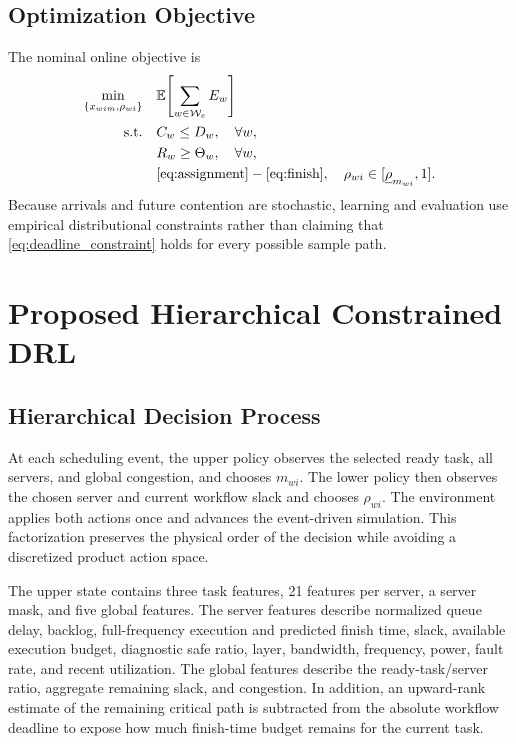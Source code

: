\documentclass[lettersize,journal]{IEEEtran}
\begin{document}
\subsection{Optimization Objective}
The nominal online objective is
\begin{align}
 \min_{\{x_{wim},\rho_{wi}\}}\quad &
 \mathbb{E}\!\left[\sum_{w\in\mathcal{W}_e}E_w\right] \label{eq:objective}\\
 \mathrm{s.t.}\quad & C_w\le D_w,\quad \forall w,\label{eq:deadline_constraint}\\
 &R_w\ge\Theta_w,\quad \forall w,\label{eq:reliability_constraint}\\
 &\eqref{eq:assignment}-\eqref{eq:finish},\quad
 \rho_{wi}\in[\underline\rho_{m_{wi}},1].
\end{align}
Because arrivals and future contention are stochastic, learning and evaluation
use empirical distributional constraints rather than claiming that
\eqref{eq:deadline_constraint} holds for every possible sample path.

\section{Proposed Hierarchical Constrained DRL}
\label{sec:method}

\subsection{Hierarchical Decision Process}
At each scheduling event, the upper policy observes the selected ready task,
all servers, and global congestion, and chooses $m_{wi}$. The lower policy then
observes the chosen server and current workflow slack and chooses $\rho_{wi}$.
The environment applies both actions once and advances the event-driven
simulation. This factorization preserves the physical order of the decision
while avoiding a discretized product action space.

The upper state contains three task features, 21 features per server, a server
mask, and five global features. The server features describe normalized queue
delay, backlog, full-frequency execution and predicted finish time, slack,
available execution budget, diagnostic safe ratio, layer, bandwidth, frequency,
power, fault rate, and recent utilization. The global features describe the
ready-task/server ratio, aggregate remaining slack, and congestion. In addition,
an upward-rank estimate of the remaining critical path is subtracted from the
absolute workflow deadline to expose how much finish-time budget remains for
the current task.
\end{document}
